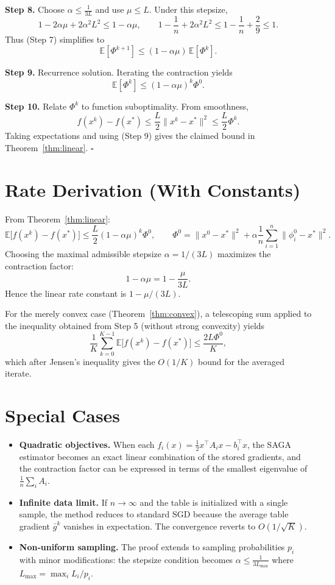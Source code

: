 \documentclass[11pt]{article}
\newcommand{\E}{\mathbb{E}}
\begin{document}
\noindent\textbf{Step 8.} Choose $\alpha\le\frac{1}{3L}$ and use $\mu\le L$.  
Under this stepsize,
\[
1-2\alpha\mu +2\alpha^{2}L^{2}\le 1-\alpha\mu,\qquad
1-\frac{1}{n}+2\alpha^{2}L^{2}\le 1-\frac{1}{n}+ \frac{2}{9}\le 1.
\]
Thus (Step 7) simplifies to
\[
\E[\Phi^{k+1}] \le (1-\alpha\mu)\,\E[\Phi^{k}]. \tag{Step 8}
\]

\noindent\textbf{Step 9.} Recurrence solution.  
Iterating the contraction yields
\[
\E[\Phi^{k}] \le (1-\alpha\mu)^{k}\Phi^{0}. \tag{Step 9}
\]

\noindent\textbf{Step 10.} Relate $\Phi^{k}$ to function suboptimality.  
From smoothness,
\[
f(x^{k})-f(x^{*})\le \frac{L}{2}\|x^{k}-x^{*}\|^{2}\le \frac{L}{2}\Phi^{k}.
\]
Taking expectations and using (Step 9) gives the claimed bound in Theorem~\ref{thm:linear}. \hfill $\square$

\section*{Rate Derivation (With Constants)}
From Theorem~\ref{thm:linear}:
\[
\E\bigl[f(x^{k})-f(x^{*})\bigr]
\le \frac{L}{2}(1-\alpha\mu)^{k}\Phi^{0},
\qquad 
\Phi^{0}= \|x^{0}-x^{*}\|^{2}+ \alpha\frac{1}{n}\sum_{i=1}^{n}\|\phi_i^{0}-x^{*}\|^{2}.
\]
Choosing the maximal admissible stepsize $\alpha=1/(3L)$ maximizes the contraction factor:
\[
1-\alpha\mu = 1-\frac{\mu}{3L}.
\]
Hence the linear rate constant is $1-\mu/(3L)$.

For the merely convex case (Theorem~\ref{thm:convex}), a telescoping sum applied to the inequality obtained from Step 5 (without strong convexity) yields
\[
\frac{1}{K}\sum_{k=0}^{K-1}\E\bigl[f(x^{k})-f(x^{*})\bigr]
\le \frac{2L\Phi^{0}}{K},
\]
which after Jensen’s inequality gives the $O(1/K)$ bound for the averaged iterate.

\section*{Special Cases}
\begin{itemize}
\item \textbf{Quadratic objectives.} When each $f_i(x)=\frac{1}{2}x^{\top}A_i x-b_i^{\top}x$, the SAGA estimator becomes an exact linear combination of the stored gradients, and the contraction factor can be expressed in terms of the smallest eigenvalue of $\frac{1}{n}\sum_i A_i$.
\item \textbf{Infinite data limit.} If $n\to\infty$ and the table is initialized with a single sample, the method reduces to standard SGD because the average table gradient $\bar g^{k}$ vanishes in expectation. The convergence reverts to $O(1/\sqrt{K})$.
\item \textbf{Non‑uniform sampling.} The proof extends to sampling probabilities $p_i$ with minor modifications: the stepsize condition becomes $\alpha\le \frac{1}{3L_{\max}}$ where $L_{\max}=\max_i L_i/p_i$.
\end{itemize}
\end{document}
